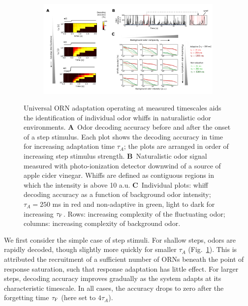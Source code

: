 \begin{figure}[!tb]
	\begin{subfigure}[t]{\linewidth}
		{\includegraphics[width=\linewidth]{figures/4_temporal_coding}}
		\label{fig:temporal_coding_a}
	\end{subfigure}
	\begin{subfigure}[t]{0\linewidth}
		\label{fig:temporal_coding_b}
	\end{subfigure}
	\begin{subfigure}[t]{0\linewidth}
		\label{fig:temporal_coding_c}
	\end{subfigure}
	\caption{\footnotesize{Universal ORN adaptation operating at measured timescales aids the identification of individual odor whiffs in naturalistic odor environments.
    \textbf{A}~Odor decoding accuracy before and after the onset of a step stimulus. Each plot shows the decoding accuracy in time for increasing adaptation time $\tau_A$; the plots are arranged in order of increasing step stimulus strength. 
    \textbf{B}~Naturalistic odor signal measured with photo-ionization detector downwind of a source of apple cider vinegar. Whiffs are defined as contiguous regions in which the intensity is above 10 a.u.
    \textbf{C}~Individual plots: whiff decoding accuracy as a function of background odor intensity; $\tau_A = 250$ ms in red and non-adaptive in green, light to dark for increasing $\tau_{\textup{F}}$. Rows: increasing complexity of the fluctuating odor; columns: increasing complexity of background odor. }}
	\label{fig:temporal_coding}
\end{figure}

We first consider the simple case of step stimuli. For shallow steps, odors are rapidly decoded, though slightly more quickly for smaller $\tau_A$ (Fig.~\ref{fig:temporal_coding_a}). This is attributed the recruitment of a sufficient number of ORNs beneath the point of response saturation, such that response adaptation has little effect. For larger steps, decoding accuracy improves gradually as the system adapts at its characteristic timescale. In all cases, the accuracy drops to zero after the forgetting time $\tau_{\textup{F}}$ (here set to $4\tau_A$). 

